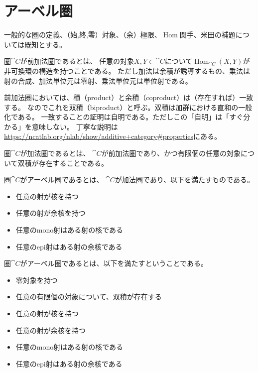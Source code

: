 \documentclass[a4j]{jarticle}
\newcommand{\Hom}{\operatorname{Hom}}
\begin{document}
\section{アーベル圏}
一般的な圏の定義、（始,終,零）対象、（余）極限、$\Hom$関手、米田の補題については既知とする。

\begin{Def}
    圏$\cat{C}$が前加法圏であるとは、
    任意の対象$X, Y \in \cat{C}$について$\Hom_{\cat{C}}(X,Y)$が非可換環の構造を持つことである。
    ただし加法は余積が誘導するもの、乗法は射の合成、加法単位元は零射、乗法単位元は単位射である。
\end{Def}

前加法圏においては、積（product）と余積（coproduct）は（存在すれば）一致する。
なのでこれを双積（biproduct）と呼ぶ。双積は加群における直和の一般化である。
一致することの証明は自明である。ただしこの「自明」は「すぐ分かる」を意味しない。
丁寧な説明は\url{https://ncatlab.org/nlab/show/additive+category#properties}にある。

\begin{Def}
    圏$\cat{C}$が加法圏であるとは、
    $\cat{C}$が前加法圏であり、かつ有限個の任意の対象について双積が存在することである。
\end{Def}

\begin{Def}
    圏$\cat{C}$がアーベル圏であるとは、
    $\cat{C}$が加法圏であり、以下を満たすものである。
    \begin{itemize}
    \item 任意の射が核を持つ
    \item 任意の射が余核を持つ
    \item 任意のmono射はある射の核である
    \item 任意のepi射はある射の余核である
    \end{itemize}
\end{Def}

\begin{Def}
    圏$\cat{C}$がアーベル圏であるとは、以下を満たすということである。
    \begin{itemize}
    \item 零対象を持つ
    \item 任意の有限個の対象について、双積が存在する
    \item 任意の射が核を持つ
    \item 任意の射が余核を持つ
    \item 任意のmono射はある射の核である
    \item 任意のepi射はある射の余核である
    \end{itemize}
\end{Def}
\end{document}
